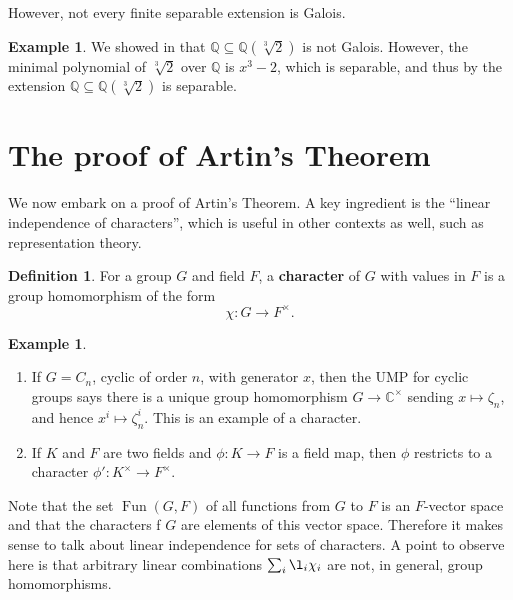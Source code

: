 \documentclass[12pt]{report}
\numberwithin{equation}{section}
\numberwithin{theorem}{chapter}
\theoremstyle{definition}
\newtheorem{definition}[theorem]{Definition}
\newtheorem{example}[theorem]{Example}
\newtheorem*{basic properties}{Basic Properties}
\newtheorem*{Important Remark}{Important Remark}
\newcommand{\df}[1]{{\bf #1}\index{#1}}
\DeclareMathOperator{\Fun}{Fun}
\newcommand{\C}{\mathbb{C}}
\begin{document}
However, not every finite separable extension is Galois.

\begin{example}
	We showed in  that $\mathbb{Q} \subseteq \mathbb{Q}(\sqrt[3]{2})$ is not Galois. However, the minimal polynomial of $\sqrt[3]{2}$ over $\mathbb{Q}$ is $x^3-2$, which is separable, and thus by  the extension $\mathbb{Q} \subseteq \mathbb{Q}(\sqrt[3]{2})$ is separable.
\end{example}




\section{The proof of Artin's Theorem}

We now embark on a proof of Artin's Theorem. A key ingredient is the ``linear independence of characters'', which is useful in other contexts as well, such as representation theory.

\begin{definition}
For a group $G$ and field $F$, a \df{character} of $G$ with values in $F$ is a group homomorphism of the form
$$\chi: G \to F^\times.$$
\end{definition}



\begin{example}$\,$
\begin{enumerate}[label=\arabic*)]
\item If $G = C_n$, cyclic of order $n$, with generator $x$, then the UMP for cyclic groups says there is a unique group homomorphism  $G \to \C^\times$ sending $x\mapsto \zeta_n$, and hence $x^i \mapsto \zeta_n^i$. This is an example of a character.

\item If $K$ and $F$ are two fields and $\phi: K \to F$ is a field map, then $\phi$ restricts to a character $\phi': K^\times \to F^\times$.
\end{enumerate}
\end{example}


Note that the set $\Fun(G,F)$ of all functions from $G$ to $F$ is an $F$-vector space and that the characters f $G$ are elements of this vector space. Therefore it makes sense to talk about linear independence for sets of characters. A point to observe here is that arbitrary linear combinations  $\sum_i \l_i \chi_i$ are not, in general, group homomorphisms.
\end{document}
